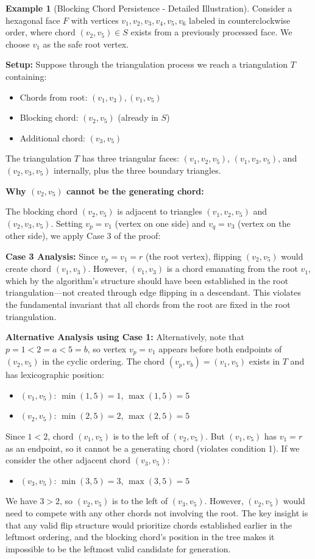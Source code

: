 \documentclass[12pt,a4paper]{article}
\theoremstyle{definition}
\newtheorem{example}{Example}
\theoremstyle{remark}
\begin{document}
\begin{example}[Blocking Chord Persistence - Detailed Illustration]
Consider a hexagonal face $F$ with vertices $v_1, v_2, v_3, v_4, v_5, v_6$ labeled in counterclockwise order, where chord $(v_2, v_5) \in S$ exists from a previously processed face. We choose $v_1$ as the safe root vertex.

\textbf{Setup:} Suppose through the triangulation process we reach a triangulation $T$ containing:
\begin{itemize}
    \item Chords from root: $(v_1, v_3), (v_1, v_5)$
    \item Blocking chord: $(v_2, v_5)$ (already in $S$)
    \item Additional chord: $(v_3, v_5)$
\end{itemize}

The triangulation $T$ has three triangular faces: $(v_1, v_2, v_5)$, $(v_1, v_3, v_5)$, and $(v_2, v_3, v_5)$ internally, plus the three boundary triangles.

\textbf{Why $(v_2, v_5)$ cannot be the generating chord:}

The blocking chord $(v_2, v_5)$ is adjacent to triangles $(v_1, v_2, v_5)$ and $(v_2, v_3, v_5)$. Setting $v_p = v_1$ (vertex on one side) and $v_q = v_3$ (vertex on the other side), we apply Case 3 of the proof:

\textbf{Case 3 Analysis:} Since $v_p = v_1 = r$ (the root vertex), flipping $(v_2, v_5)$ would create chord $(v_1, v_3)$. However, $(v_1, v_3)$ is a chord emanating from the root $v_1$, which by the algorithm's structure should have been established in the root triangulation---not created through edge flipping in a descendant. This violates the fundamental invariant that all chords from the root are fixed in the root triangulation.

\textbf{Alternative Analysis using Case 1:} Alternatively, note that $p = 1 < 2 = a < 5 = b$, so vertex $v_p = v_1$ appears before both endpoints of $(v_2, v_5)$ in the cyclic ordering. The chord $(v_p, v_b) = (v_1, v_5)$ exists in $T$ and has lexicographic position:
\begin{itemize}
    \item $(v_1, v_5)$: $\min(1, 5) = 1$, $\max(1, 5) = 5$
    \item $(v_2, v_5)$: $\min(2, 5) = 2$, $\max(2, 5) = 5$
\end{itemize}
Since $1 < 2$, chord $(v_1, v_5)$ is to the left of $(v_2, v_5)$. But $(v_1, v_5)$ has $v_1 = r$ as an endpoint, so it cannot be a generating chord (violates condition 1). If we consider the other adjacent chord $(v_3, v_5)$:
\begin{itemize}
    \item $(v_3, v_5)$: $\min(3, 5) = 3$, $\max(3, 5) = 5$
\end{itemize}
We have $3 > 2$, so $(v_2, v_5)$ is to the left of $(v_3, v_5)$. However, $(v_2, v_5)$ would need to compete with any other chords not involving the root. The key insight is that any valid flip structure would prioritize chords established earlier in the leftmost ordering, and the blocking chord's position in the tree makes it impossible to be the leftmost valid candidate for generation.


\end{example}
\end{document}
